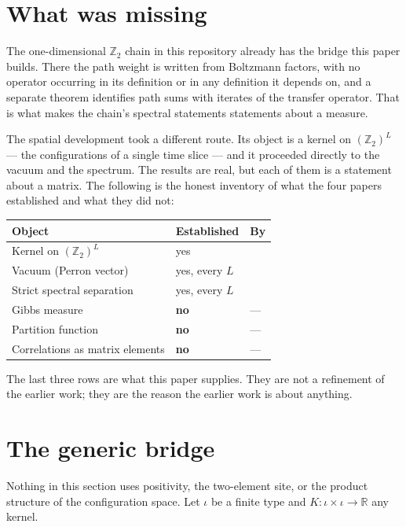 \documentclass[11pt]{article}
\theoremstyle{definition}
\newcommand{\R}{\mathbb{R}}
\newcommand{\Z}{\mathbb{Z}}
\begin{document}
\section{What was missing}\label{sec:missing}

The one-dimensional $\Z_2$ chain in this repository already has the bridge this
paper builds.  There the path weight is written from Boltzmann factors, with no
operator occurring in its definition or in any definition it depends on, and a
separate theorem identifies path sums with iterates of the transfer operator.
That is what makes the chain's spectral statements statements about a measure.

The spatial development took a different route.  Its object is a kernel on
$(\Z_2)^L$ --- the configurations of a single time slice --- and it proceeded
directly to the vacuum and the spectrum.  The results are real, but each of
them is a statement about a matrix.  The following is the honest inventory of
what the four papers established and what they did not:

\begin{center}
\begin{tabular}{lll}
\toprule
Object & Established & By \\
\midrule
Kernel on $(\Z_2)^L$ & yes & \cite{ErikssonSpatial} \\
Vacuum (Perron vector) & yes, every $L$ & \cite{ErikssonPerron} \\
Strict spectral separation & yes, every $L$ & \cite{ErikssonGap} \\
Gibbs measure & \textbf{no} & --- \\
Partition function & \textbf{no} & --- \\
Correlations as matrix elements & \textbf{no} & --- \\
\bottomrule
\end{tabular}
\end{center}

The last three rows are what this paper supplies.  They are not a refinement of
the earlier work; they are the reason the earlier work is about anything.

\section{The generic bridge}\label{sec:generic}

Nothing in this section uses positivity, the two-element site, or the product
structure of the configuration space.  Let $\iota$ be a finite type and
$K:\iota\times\iota\to\R$ any kernel.
\end{document}
